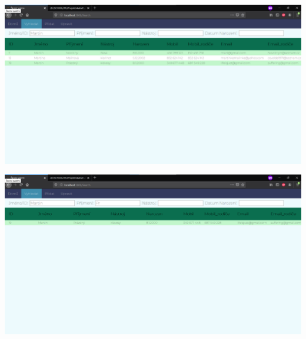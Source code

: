 \documentclass[a4paper, 11pt, twocolumn]{article}
\begin{document}
	\begin{center}
	\includegraphics[width=1\textwidth]{administ_search_1.png}
	\end{center}
	\vspace*{\fill}
	\begin{center}
	\includegraphics[width=1\textwidth]{administ_search_2.png}
	\end{center}


	\vspace*{\fill}
	\clearpage
\end{document}
